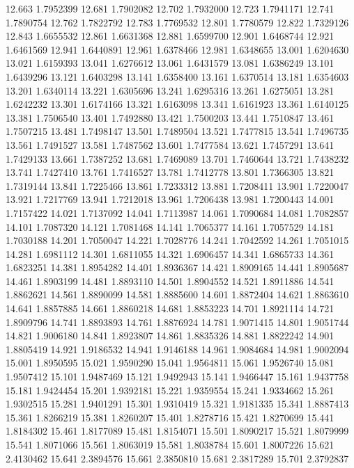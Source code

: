 12.663 1.7952399
12.681 1.7902082
12.702 1.7932000
12.723 1.7941171
12.741 1.7890754
12.762 1.7822792
12.783 1.7769532
12.801 1.7780579
12.822 1.7329126
12.843 1.6655532
12.861 1.6631368
12.881 1.6599700
12.901 1.6468744
12.921 1.6461569
12.941 1.6440891
12.961 1.6378466
12.981 1.6348655
13.001 1.6204630
13.021 1.6159393
13.041 1.6276612
13.061 1.6431579
13.081 1.6386249
13.101 1.6439296
13.121 1.6403298
13.141 1.6358400
13.161 1.6370514
13.181 1.6354603
13.201 1.6340114
13.221 1.6305696
13.241 1.6295316
13.261 1.6275051
13.281 1.6242232
13.301 1.6174166
13.321 1.6163098
13.341 1.6161923
13.361 1.6140125
13.381 1.7506540
13.401 1.7492880
13.421 1.7500203
13.441 1.7510847
13.461 1.7507215
13.481 1.7498147
13.501 1.7489504
13.521 1.7477815
13.541 1.7496735
13.561 1.7491527
13.581 1.7487562
13.601 1.7477584
13.621 1.7457291
13.641 1.7429133
13.661 1.7387252
13.681 1.7469089
13.701 1.7460644
13.721 1.7438232
13.741 1.7427410
13.761 1.7416527
13.781 1.7412778
13.801 1.7366305
13.821 1.7319144
13.841 1.7225466
13.861 1.7233312
13.881 1.7208411
13.901 1.7220047
13.921 1.7217769
13.941 1.7212018
13.961 1.7206438
13.981 1.7200443
14.001 1.7157422
14.021 1.7137092
14.041 1.7113987
14.061 1.7090684
14.081 1.7082857
14.101 1.7087320
14.121 1.7081468
14.141 1.7065377
14.161 1.7057529
14.181 1.7030188
14.201 1.7050047
14.221 1.7028776
14.241 1.7042592
14.261 1.7051015
14.281 1.6981112
14.301 1.6811055
14.321 1.6906457
14.341 1.6865733
14.361 1.6823251
14.381 1.8954282
14.401 1.8936367
14.421 1.8909165
14.441 1.8905687
14.461 1.8903199
14.481 1.8893110
14.501 1.8904552
14.521 1.8911886
14.541 1.8862621
14.561 1.8890099
14.581 1.8885600
14.601 1.8872404
14.621 1.8863610
14.641 1.8857885
14.661 1.8860218
14.681 1.8853223
14.701 1.8921114
14.721 1.8909796
14.741 1.8893893
14.761 1.8876924
14.781 1.9071415
14.801 1.9051744
14.821 1.9006180
14.841 1.8923807
14.861 1.8835326
14.881 1.8822242
14.901 1.8805419
14.921 1.9186532
14.941 1.9146188
14.961 1.9084684
14.981 1.9002094
15.001 1.8950595
15.021 1.9590290
15.041 1.9564811
15.061 1.9526740
15.081 1.9507412
15.101 1.9487469
15.121 1.9492943
15.141 1.9466447
15.161 1.9437758
15.181 1.9424454
15.201 1.9392181
15.221 1.9359554
15.241 1.9334662
15.261 1.9302515
15.281 1.9401291
15.301 1.9310419
15.321 1.9181335
15.341 1.8887413
15.361 1.8266219
15.381 1.8260207
15.401 1.8278716
15.421 1.8270699
15.441 1.8184302
15.461 1.8177089
15.481 1.8154071
15.501 1.8090217
15.521 1.8079999
15.541 1.8071066
15.561 1.8063019
15.581 1.8038784
15.601 1.8007226
15.621 2.4130462
15.641 2.3894576
15.661 2.3850810
15.681 2.3817289
15.701 2.3792837

